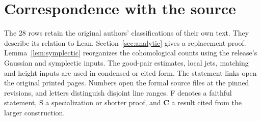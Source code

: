 \documentclass[letterpaper,11pt]{article}
\begin{document}
\section{Correspondence with the source}\label{sec:correspondence}
The 28 rows retain the original authors' classifications of their own text. They describe its relation to Lean. Section~\ref{sec:analytic} gives a replacement proof. Lemma~\ref{lem:symplectic} reorganizes the cohomological counts using the release's Gaussian and symplectic inputs. The good-pair estimates, local jets, matching and height inputs are used in condensed or cited form. The statement links open the original printed pages. Numbers open the formal source files at the pinned revisions, and letters distinguish disjoint line ranges. F denotes a faithful statement, S a specialization or shorter proof, and \textbf{C} a result cited from the larger construction.
\end{document}
